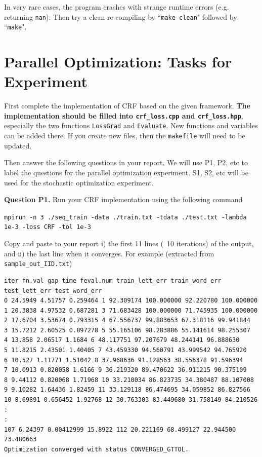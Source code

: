 \documentclass[11pt]{report}
\begin{document}
In very rare cases, the program crashes with strange runtime errors (e.g. returning \verb!nan!).
Then try a clean re-compiling by ``\verb!make clean!" followed by ``\verb!make!".

\section{Parallel Optimization: Tasks for Experiment}

First complete the implementation of CRF based on the given framework.
{\bf The implementation should be filled into \verb!crf_loss.cpp! and \verb!crf_loss.hpp!},
especially the two functions \verb!LossGrad! and \verb!Evaluate!.
New functions and variables can be added there.
If you create new files, then the \verb!makefile! will need to be updated.

Then answer the following questions in your report.
We will use P1, P2, etc to label the questions for the parallel optimization experiment.
S1, S2, etc will be used for the stochastic optimization experiment.

{\bf Question P1.}
Run your CRF implementation using the following command

{\small
\verb!mpirun -n 3 ./seq_train -data ./train.txt -tdata ./test.txt -lambda 1e-3 -loss CRF -tol 1e-3!
}
\vspace{-1em}

Copy and paste to your report
i) the first 11 lines (\ie\ 10 iterations) of the output,
and
ii) the last line when it converges.
%
For example (extracted from \verb!sample_out_IID.txt!)

\vspace{-1em}
\begin{verbatim}
iter fn.val gap time feval.num train_lett_err train_word_err test_lett_err test_word_err
0 24.5949 4.51757 0.259464 1 92.309174 100.000000 92.220780 100.000000
1 20.3838 4.97532 0.687281 3 71.683428 100.000000 71.745935 100.000000
2 17.6704 3.53674 0.793315 4 67.556737 99.883653 67.318116 99.941844
3 15.7212 2.60525 0.897278 5 55.165106 98.283886 55.141614 98.255307
4 13.858 2.06517 1.1684 6 48.117751 97.207679 48.244141 96.888630
5 11.8215 2.43501 1.40405 7 43.459330 94.560791 43.999542 94.765920
6 10.527 1.11771 1.51042 8 37.968636 91.128563 38.556378 91.596394
7 10.0913 0.820058 1.6166 9 36.219320 89.470622 36.911215 90.375109
8 9.44112 0.820068 1.71968 10 33.210034 86.823735 34.380487 88.107008
9 9.10282 1.64436 1.82459 11 33.129118 86.474695 34.059852 86.827566
10 8.69891 0.656452 1.92768 12 30.763303 83.449680 31.758149 84.210526
:
:
107 6.24397 0.00412999 15.8922 112 20.221169 68.499127 22.944500 73.480663
Optimization converged with status CONVERGED_GTTOL.
\end{verbatim}
\end{document}
